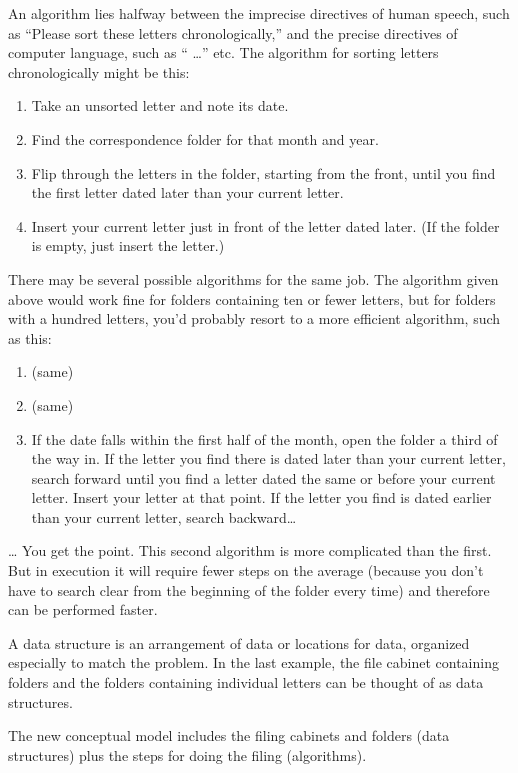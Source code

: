 An algorithm lies halfway between the imprecise directives of human
speech, such as ``Please sort these letters chronologically,'' and the
precise directives of computer language, such as ``
\dots{}'' etc. The algorithm for sorting letters chronologically might be
this:
\begin{enumerate}
\item Take an unsorted letter and note its date.
\item Find the correspondence folder for that month and year.
\item Flip through the letters in the folder, starting from the front, until
   you find the first letter dated later than your current letter.
\item Insert your current letter just in front of the letter dated later.
   (If the folder is empty, just insert the letter.)
\end{enumerate}
There may be several possible algorithms for the same job. The algorithm
given above would work fine for folders containing ten or fewer letters,
but for folders with a hundred letters, you'd probably resort to a more
efficient algorithm, such as this:
\begin{enumerate}
\item (same)
\item (same)
\item If the date falls within the first half of the month, open the
folder a third of the way in. If the letter you find there is dated later
than your current letter, search forward until you find a letter dated the
same or before your current letter. Insert your letter at that point. If
the letter you find is dated earlier than your current letter, search
backward\dots{}
\end{enumerate}
\dots{} You get the point. This second algorithm is more complicated than
the first. But in execution it will require fewer steps on the average
(because you don't have to search clear from the beginning of the folder
every time) and therefore can be performed faster.

A data structure is an arrangement of data or locations for data,
organized especially to match the problem. In the last example, the file
cabinet containing folders and the folders containing individual letters
can be thought of as data structures.
%

The new conceptual model includes the filing cabinets and folders
(data structures) plus the steps for doing the filing (algorithms).
%

